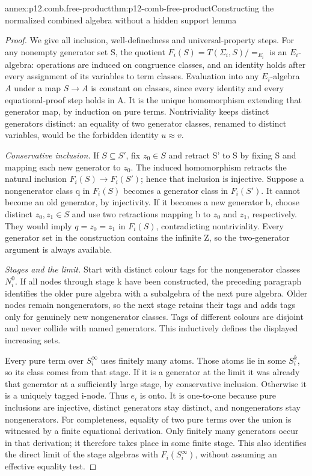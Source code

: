 \begin{annexitem}{annex:p12.comb.free-product}{thm:p12-comb-free-product}{Constructing the normalized combined algebra without a hidden support lemma}
\begin{proof}
We give all inclusion, well-definedness and universal-property steps.
For any nonempty generator set S, the quotient
\(F_i(S)=T(\Sigma_i,S)/{=_{E_i}}\) is an \(E_i\)-algebra: operations
are induced on congruence classes, and an identity holds after every
assignment of its variables to term classes. Evaluation into any
 \(E_i\)-algebra \(A\) under a map \(S\to A\) is constant on classes, since
every identity and every equational-proof step holds in A. It is
the unique homomorphism extending that generator map, by induction
on pure terms. Nontriviality keeps distinct generators distinct:
an equality of two generator classes, renamed to distinct variables,
would be the forbidden identity \(u\approx v\).

\emph{Conservative inclusion.} If \(S\subseteq S'\), fix \(z_0\in S\)
and retract S' to S by fixing S and mapping each new generator to
\(z_0\). The induced homomorphism retracts the natural inclusion
\(F_i(S)\to F_i(S')\); hence that inclusion is injective.
Suppose a nongenerator class q in \(F_i(S)\) becomes a generator
class in \(F_i(S')\). It cannot become an old generator, by
injectivity. If it becomes a new generator b, choose distinct
\(z_0,z_1\in S\) and use two retractions mapping b to \(z_0\)
and \(z_1\), respectively. They would imply
\(q=z_0=z_1\) in \(F_i(S)\), contradicting nontriviality.
Every generator set in the construction contains the infinite Z,
so the two-generator argument is always available.

\emph{Stages and the limit.} Start with distinct colour tags for the
nongenerator classes \(N_i^0\). If all nodes through stage k have
been constructed, the preceding paragraph identifies the older
pure algebra with a subalgebra of the next pure algebra. Older
nodes remain nongenerators, so the next stage retains their tags
and adds tags only for genuinely new nongenerator classes.
Tags of different colours are disjoint and never collide with named
generators. This inductively defines the displayed increasing sets.

Every pure term over \(S_i^\infty\) uses finitely many atoms. Those
atoms lie in some \(S_i^k\), so its class comes from that stage.
If it is a generator at the limit it was already that generator
at a sufficiently large stage, by conservative inclusion. Otherwise
it is a uniquely tagged i-node. Thus \(e_i\) is onto.
It is one-to-one because pure inclusions are injective, distinct
generators stay distinct, and nongenerators stay nongenerators.
For completeness, equality of two pure terms over the union is
witnessed by a finite equational derivation. Only finitely many
generators occur in that derivation; it therefore takes place in
some finite stage. This also identifies the direct limit of the
stage algebras with \(F_i(S_i^\infty)\), without assuming an
effective equality test.


\end{proof}
\end{annexitem}
